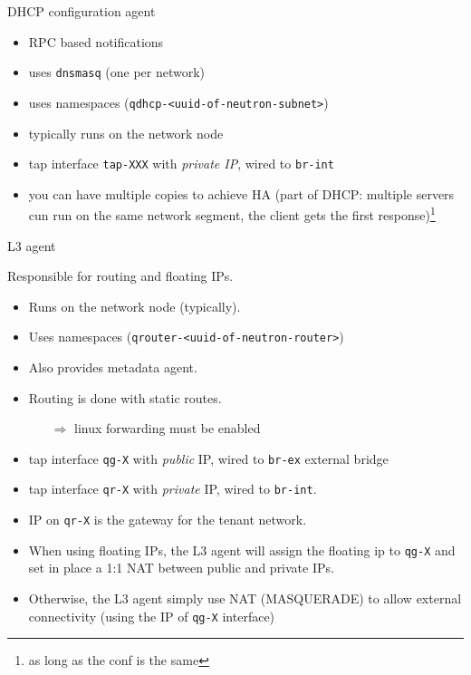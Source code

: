 \documentclass[english,serif,mathserif,xcolor=pdftex,dvipsnames,table]{beamer}
\begin{document}
\begin{frame}
  {DHCP configuration agent}
  \begin{itemize}
  \item RPC based notifications
  \item uses \texttt{dnsmasq} (one per network)
  \item uses namespaces (\texttt{qdhcp-<uuid-of-neutron-subnet>})
  \item typically runs on the network node
  \item tap interface \texttt{tap-XXX} with \textit{private IP}, wired
    to \texttt{br-int}
  \item you can have multiple copies to achieve HA (part of DHCP:
    multiple servers cun run on the same network segment, the client
    gets the first response)\footnote{as long as the conf is the same}
  \end{itemize}
\end{frame}

\begin{frame}
  {L3 agent}

  Responsible for routing and floating IPs.

\scriptsize  \begin{itemize}
  \item Runs on the network node (typically).

  \item Uses namespaces (\texttt{qrouter-<uuid-of-neutron-router>})

  \item Also provides metadata agent.

  \item Routing is done with static routes.
    \begin{itemize}\scriptsize
    \item[$\Rightarrow$] linux forwarding must be enabled
    \end{itemize}
  \item tap interface \texttt{qg-X} with \textit{public} IP, wired to
    \texttt{br-ex} external bridge

  \item tap interface \texttt{qr-X} with \textit{private} IP, wired to
    \texttt{br-int}.

  \item IP on \texttt{qr-X} is the gateway for the tenant network.

  \item When using floating IPs, the L3 agent will assign the floating
    ip to \texttt{qg-X} and set in place a 1:1 NAT between public and
    private IPs.

  \item Otherwise, the L3 agent simply use NAT (MASQUERADE) to allow
    external connectivity (using the IP of \texttt{qg-X} interface)
  \end{itemize}
\end{frame}
\end{document}
